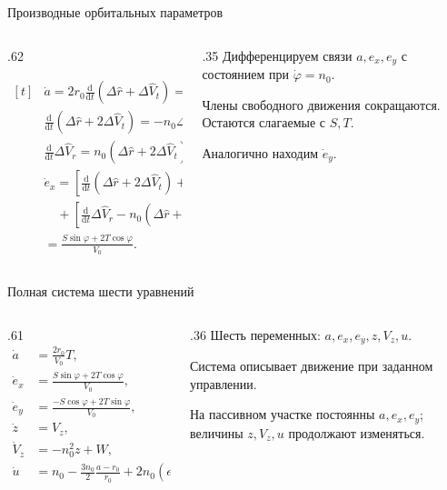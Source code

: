 \documentclass[11pt,aspectratio=169,t]{beamer}
\newcommand{\eqcompact}{\fontsize{10}{12}\selectfont}
\newcommand{\dvr}{\Delta\widehat V_r}
\newcommand{\dvt}{\Delta\widehat V_t}
\newcommand{\drh}{\Delta\widehat r}
\begin{document}
\begin{frame}{Производные орбитальных параметров}
\relax
\begin{columns}[T,onlytextwidth]
\begin{column}{.62\textwidth}
{\eqcompact\derivationmathspacing\centering
\noindent\(\displaystyle\begin{aligned}[t]
 & \dot a=2r_0\frac{\mathrm d}{\mathrm dt}(\drh+\dvt)
                =\frac{2r_0}{V_0}T,\\[3pt]
 & \frac{\mathrm d}{\mathrm dt}(\drh+2\dvt)
       =-n_0\dvr+\frac{2T}{V_0},\\[3pt]
 & \frac{\mathrm d}{\mathrm dt}\dvr
       =n_0(\drh+2\dvt)+\frac{S}{V_0},\\[3pt]
 & \dot e_x=\left[\frac{\mathrm d}{\mathrm dt}(\drh+2\dvt)+n_0\dvr\right]\cos\varphi\\[2pt]
 & \quad+\left[\frac{\mathrm d}{\mathrm dt}\dvr-n_0(\drh+2\dvt)\right]\sin\varphi\\[4pt]
 & =\frac{S\sin\varphi+2T\cos\varphi}{V_0}.
\end{aligned}\)\par
}
\end{column}
\begin{column}{.35\textwidth}
\RaggedRight
Дифференцируем связи $a,e_x,e_y$ с состоянием при $\dot\varphi=n_0$.\par\medskip
Члены свободного движения сокращаются. Остаются слагаемые с $S,T$.\par\medskip
Аналогично находим $\dot e_y$.
\end{column}
\end{columns}
\end{frame}

\begin{frame}{Полная система шести уравнений}
\relax
\begin{columns}[T,onlytextwidth]
\begin{column}{.61\textwidth}
{\eqcompact\derivationmathspacing
\[
\boxed{\begin{aligned}
 \dot a&=\frac{2r_0}{V_0}T,\\[4pt]
 \dot e_x&=\frac{S\sin\varphi+2T\cos\varphi}{V_0},\\[4pt]
 \dot e_y&=\frac{-S\cos\varphi+2T\sin\varphi}{V_0},\\[4pt]
 \dot z&=V_z,\\[4pt]
 \dot V_z&=-n_0^2z+W,\\[4pt]
 \dot u&=n_0-\frac{3n_0}{2}\frac{a-r_0}{r_0}
              +2n_0(e_x\cos\varphi+e_y\sin\varphi).
\end{aligned}}
\]
}
\end{column}
\begin{column}{.36\textwidth}
\RaggedRight
Шесть переменных: $a,e_x,e_y,z,V_z,u$.\par\medskip
Система описывает движение при заданном управлении.\par\medskip
На пассивном участке постоянны $a,e_x,e_y$; величины $z,V_z,u$ продолжают изменяться.
\end{column}
\end{columns}
\end{frame}
\end{document}
